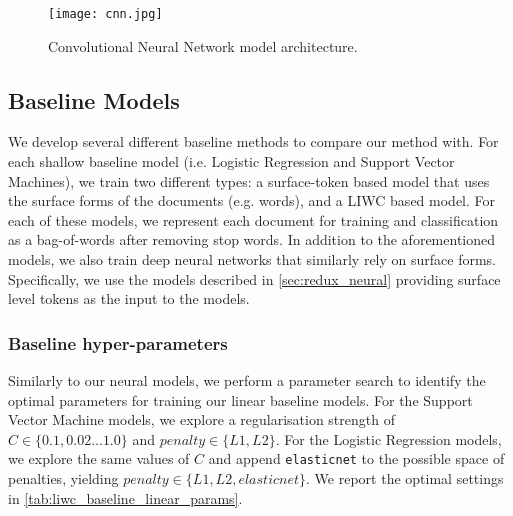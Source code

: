 \begin{figure}
  \centering
  \texttt{[image: cnn.jpg]}
  \caption{Convolutional Neural Network model architecture.}
  \label{fig:liwc_cnn}
\end{figure}

\subsection{Baseline Models}

We develop several different baseline methods to compare our method with. For each shallow baseline model (i.e. Logistic Regression and Support Vector Machines), we train two different types: a surface-token based model that uses the surface forms of the documents (e.g. words), and a LIWC based model. For each of these models, we represent each document for training and classification as a bag-of-words after removing stop words. In addition to the aforementioned models, we also train deep neural networks that similarly rely on surface forms. Specifically, we use the models described in \autoref{sec:redux_neural} providing surface level tokens as the input to the models.

\subsubsection{Baseline hyper-parameters}

Similarly to our neural models, we perform a parameter search to identify the optimal parameters for training our linear baseline models. For the Support Vector Machine models, we explore a regularisation strength of $C \in \{0.1, 0.02 \ldots 1.0\}$ and $penalty \in \{L1, L2\}$. For the Logistic Regression models, we explore the same values of $C$ and append \texttt{elasticnet} to the possible space of penalties, yielding $penalty \in \{L1, L2, elasticnet\}$. We report the optimal settings in \autoref{tab:liwc_baseline_linear_params}.


